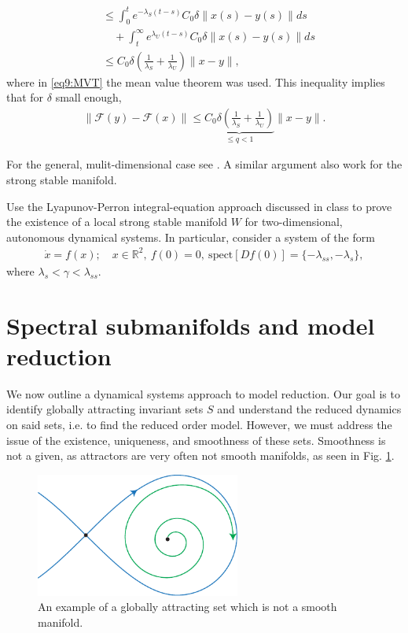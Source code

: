 \begin{enumerate}
\begin{align}
					    &\leq \int_{0}^{t} e^{-\lambda _{S}(t-s)}C_0 \delta \| x(s) - y(s)\| ds \\
					    &\quad + \int_{t}^{\infty } e^{\lambda _{U}(t-s)}C_0 \delta \|x(s) - y(s)\| ds \label{eq9:MVT}\\
					    &\leq C_0 \delta \left(\frac{1}{\lambda _{S}} + \frac{1}{\lambda _{U}} \right) \| x - y\|,
\end{align}
where in \eqref{eq9:MVT} the mean value theorem was used. This inequality implies that for $\delta$ small enough,
\begin{align}
	\|\mathcal{F}(y) - \mathcal{F}(x) \| \leq \underbrace{C_0 \delta \left( \frac{1}{\lambda_S} + \frac{1}{\lambda _{U}}\right) }_{\leq q < 1} \| x - y\|.
\end{align}
\end{enumerate}
For the general, mulit-dimensional case see \cite{Chicone}. A similar argument also work for the strong stable manifold.

\begin{exercise}
Use the Lyapunov-Perron integral-equation approach discussed in class to prove the existence of a local strong stable manifold $W$ for two-dimensional, autonomous dynamical systems. In particular, consider a system of the form
\begin{align}
\dot{x} = f(x); \quad x\in \mathbb{R}^2,\ f(0)= 0,\ \textrm{spect}[Df(0)] = \{ -\lambda_{ss}, -\lambda_s\},
\end{align}
where $\lambda_s < \gamma < \lambda_{ss}$.
\end{exercise}


\section{Spectral submanifolds and model reduction}
We now outline a dynamical systems approach to model reduction. Our goal is to identify globally attracting invariant sets $S$ and understand the reduced dynamics on said sets, i.e. to find the reduced order model. However, we must address the issue of the existence, uniqueness, and smoothness of these sets. Smoothness is not a given, as attractors are very often not smooth manifolds, as seen in Fig. \ref{fig:nonsmooth_set}.
\begin{figure}[h!]
	\centering
	\includegraphics[width=0.6\textwidth]{figures/ch9/27nonsmooth_set.pdf}
	\caption{An example of a globally attracting set which is not a smooth manifold.}
	\label{fig:nonsmooth_set}
\end{figure}

